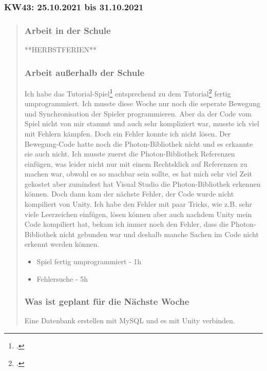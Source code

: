 \subsubsection{KW43: 25.10.2021 bis 31.10.2021}
\begin{quote}
	\subsubsection*{Arbeit in der Schule}
	**HERBSTFERIEN** 
	
	\subsubsection*{Arbeit außerhalb der Schule}
	Ich habe das Tutorial-Spiel\footcite{Karting Microgame Unity3D} entsprechend zu dem Tutorial\footcite{Unity Photon Tutorial} fertig umprogrammiert. Ich musste diese Woche nur noch die seperate Bewegung und Synchronisation der Spieler programmieren. Aber da der Code vom Spiel nicht von mir stammt und auch sehr kompliziert war, musste ich viel mit Fehlern kämpfen. Doch ein Fehler konnte ich nicht lösen. Der Bewegung-Code hatte noch die Photon-Bibliothek nicht und es erkannte sie auch nicht. Ich musste zuerst die Photon-Bibliothek Referenzen einfügen, was leider nicht nur mit einem Rechtsklick auf Referenzen zu machen war, obwohl es so machbar sein sollte, es hat mich sehr viel Zeit gekostet aber zumindest hat Visual Studio die Photon-Bibliothek erkennen können. Doch dann kam der nächste Fehler, der Code wurde nicht kompiliert von Unity. Ich habe den Fehler mit paar Tricks, wie z.B. sehr viele Leerzeichen einfügen, lösen können aber auch nachdem Unity mein Code kompiliert hat, bekam ich immer noch den Fehler, dass die Photon-Bibliothek nicht gebunden war und deshalb manche Sachen im Code nicht erkennt werden können.     
	
	\begin{itemize}
		\item Spiel fertig umprogrammiert - 1h
		\item Fehlersuche - 5h
	\end{itemize}
	
	\subsubsection*{Was ist geplant für die Nächste Woche}
	Eine Datenbank erstellen mit MySQL und es mit Unity verbinden.
\end{quote}